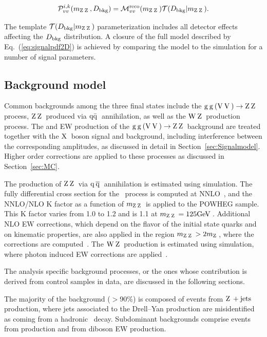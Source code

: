  \begin{eqnarray}
 {\cal P}^{i, k}_{vv}(m_{\mathrm{Z}\hspace{0.2em}\mathrm{Z}\hspace{0.2em}},D_{\mathrm{bkg}})={\cal M}^{\mathrm{reco}}_{vv}(m_{\mathrm{Z}\hspace{0.2em}\mathrm{Z}\hspace{0.2em}})  {\cal T}(D_{\mathrm{bkg}}|m_{\mathrm{Z}\hspace{0.2em}\mathrm{Z}\hspace{0.2em}}).
 \label{eq:signalpdf2D}
 \end{eqnarray}

 The template ${\cal T}(D_{\mathrm{bkg}}|m_{\mathrm{Z}\hspace{0.2em}\mathrm{Z}\hspace{0.2em}})$ parameterization includes all detector effects
 affecting the $D_{\mathrm{bkg}}$ distribution. A closure of the full model described by Eq.~(\ref{eq:signalpdf2D})
 is achieved by comparing the model to the simulation for a number of
 signal parameters.


 \subsection{Background model}
 \label{sec:Background}
 Common backgrounds among the three final states include the $\mathrm{g}\hspace{0.2em}\mathrm{g}\hspace{0.2em}(\mathrm{V}\hspace{0.2em}\mathrm{V}\hspace{0.2em})\to \mathrm{Z}\hspace{0.2em}\mathrm{Z}\hspace{0.2em}$ process, $\mathrm{Z}\hspace{0.2em}\mathrm{Z}\hspace{0.2em}$ produced via $\mathrm{q\bar{q}}\hspace{0.2em}$ annihilation, as well as the
 $\mathrm{W}\hspace{0.2em}\mathrm{Z}\hspace{0.2em}$ production process.
 The \ggF and EW production of the $\mathrm{g}\hspace{0.2em}\mathrm{g}\hspace{0.2em}(\mathrm{V}\hspace{0.2em}\mathrm{V}\hspace{0.2em})\to \mathrm{Z}\hspace{0.2em}\mathrm{Z}\hspace{0.2em}$ background are treated together with the $\mathrm{X}\hspace{0.2em}$ boson
 signal and background, including interference between the corresponding amplitudes, as discussed in detail in Section~\ref{sec:Signalmodel}. Higher order corrections are applied to these processes as discussed in Section~\ref{sec:MC}.

 The production of $\mathrm{Z}\hspace{0.2em}\mathrm{Z}\hspace{0.2em}$ via $\mathrm{q}\hspace{0.2em}\overline{\mathrm{q}}\hspace{0.2em}$ annihilation is estimated using simulation. The fully differential cross section for the \qqZZ\ process is computed at NNLO~\cite{Grazzini2015407},
 and the NNLO/NLO K factor as a function of $m_{\mathrm{Z}\hspace{0.2em}\mathrm{Z}\hspace{0.2em}}$ is applied to the {\sc POWHEG} sample.
 This K factor varies from 1.0 to 1.2 and is 1.1 at $m_{\mathrm{Z}\hspace{0.2em}\mathrm{Z}\hspace{0.2em}}=125\mathrm{GeV}\hspace{0.2em}$.
 Additional NLO EW corrections, which depend on the flavor of the initial state quarks and on kinematic properties, are also applied in the region $m_{\mathrm{Z}\hspace{0.2em} \mathrm{Z}\hspace{0.2em}}>2m_{\mathrm{Z}\hspace{0.2em}}$, where the corrections are computed~\cite{Gieseke:2014gka,Manohar:2016nzj,Baglio:2013toa}. The $\mathrm{W}\hspace{0.2em}\mathrm{Z}\hspace{0.2em}$ production is estimated using simulation, where photon induced EW corrections are applied~\cite{Frixione:2015zaa,Frixione:2014qaa}.

 The analysis specific background processes, or the ones whose contribution is derived from control samples in data, are discussed in the following sections.

 The majority of the background ($>$90\%) is composed of events from
 $\mathrm{Z}\hspace{0.2em} + \text{jets}$ production,
 where jets associated to the Drell--Yan production are misidentified as
 coming from a hadronic \cPZ\ decay. Subdominant backgrounds comprise
 events from \ttbar{} production and from diboson EW production.

